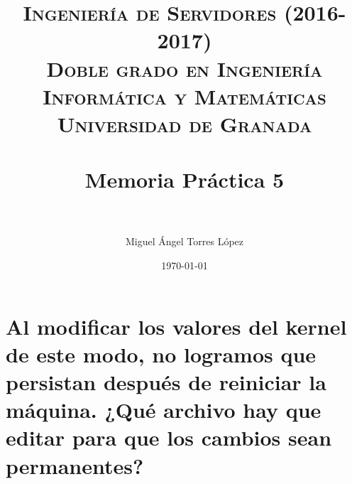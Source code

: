 
\usepackage{listings}



\title{	
\normalfont \normalsize 
\textsc{\textbf{Ingeniería de Servidores (2016-2017)} \\ Doble grado en Ingeniería Informática y Matemáticas \\ Universidad de Granada} \\ [25pt] %
\horrule{2pt} \\[0.4cm] %
\huge Memoria Práctica 5 \\ %
\horrule{2pt} \\[0.5cm] %
}

\author{Miguel Ángel Torres López} %

\date{\normalsize\today} %




\maketitle %

\newpage %

\tableofcontents %

\newpage

\listoffigures

\listoftables

\newpage


\section{Al modificar los valores del kernel de este modo, no logramos que persistan después de reiniciar la máquina. ¿Qué archivo hay que editar para que los cambios sean permanentes?}

